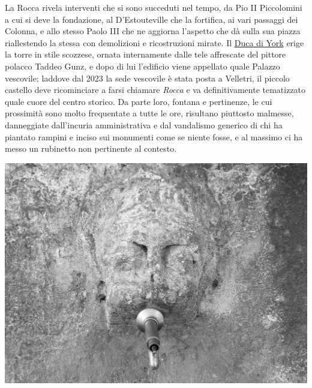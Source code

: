 \documentclass[
  letterpaper,
  DIV=11,
  numbers=noendperiod]{scrartcl}
\begin{document}
La Rocca rivela interventi che si sono succeduti nel tempo, da Pio II
Piccolomini a cui si deve la fondazione, al D'Estouteville che la
fortifica, ai vari passaggi dei Colonna, e allo stesso Paolo III che ne
aggiorna l'aspetto che dà sulla sua piazza riallestendo la stessa con
demolizioni e ricostruzioni mirate. Il
\href{https://grandtour.shop/posts/pages/2017-05-20-frascati-goethe-comandini.html}{Duca
di York} erige la torre in stile scozzese, ornata internamente dalle
tele affrescate del pittore polacco Taddeo Gunz, e dopo di lui
l'edificio viene appellato quale Palazzo vescovile; laddove dal 2023 la
sede vescovile è stata posta a Velletri, il piccolo castello deve
ricominciare a farsi chiamare \emph{Rocca} e va definitivamente
tematizzato quale cuore del centro storico. Da parte loro, fontana e
pertinenze, le cui prossimità sono molto frequentate a tutte le ore,
risultano piuttosto malmesse, danneggiate dall'incuria amministrativa e
dal vandalismo generico di chi ha piantato rampini e inciso sui
monumenti come se niente fosse, e al massimo ci ha messo un rubinetto
non pertinente al contesto. \begin{center}
\includegraphics{../../images/2024/san_rocco/10mascherone.jpg}
\end{center}
\end{document}
